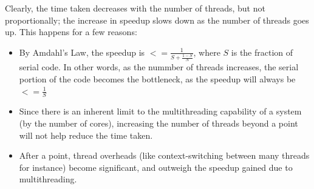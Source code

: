 \documentclass[12pt]{article}
\begin{document}
  Clearly, the time taken decreases with the number of threads, but not proportionally; the increase in speedup slows down as the number of threads goes up. This happens for a few reasons:
  
  \begin{itemize}
    \item By Amdahl's Law, the speedup is $ <= \frac{1}{S+\frac{1-S}{N}}$, where $S$ is the fraction of serial code. In other words, as the nummber of threads increases, the serial portion of the code becomes the bottleneck, as the speedup will always be $<= \frac{1}{S}$
    \item Since there is an inherent limit to the multithreading capability of a system (by the number of cores), increasing the number of threads beyond a point will not help reduce the time taken.
    \item After a point, thread overheads (like context-switching between many threads for instance) become significant, and outweigh the speedup gained due to multithreading.
  \end{itemize}







\end{document}
